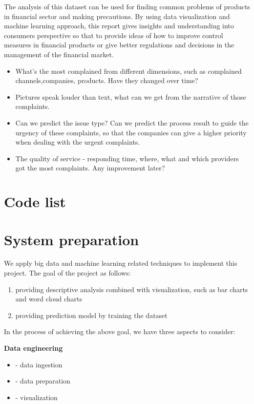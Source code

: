 \documentclass[conference]{IEEEtran}
\begin{document}
The analysis of this dataset can be used for  finding common problems of products in financial sector and making precautions. By using data visualization and machine learning approach, this report gives insights and understanding into consumers perspective so that to provide ideas of how to improve control measures in financial products or give better regulations and decisions in the management of the financial market.
\begin{itemize}
\item What's the most complained from different dimensions, such as complained channels,companies, products. Have they changed over time?

\item Pictures speak louder than text, what can we get from the narrative of those complaints.

\item Can we predict the issue type? Can we predict the process result to guide the urgency of these complaints, so that the companies can give a  higher priority when dealing with the urgent complaints.
\item The quality of service - responding time, where, what and which providers got the most complaints. Any improvement later? 

\end{itemize}

\section{Code list}

\section{System preparation}\label{AA}
We apply big data and machine learning related techniques to implement this project. The goal of the project as follows:
\begin{enumerate}[label=(\roman*)]
\item providing descriptive analysis combined with visualization, such as bar charts and word cloud charts
\item providing prediction model by training the dataset
\end{enumerate}

In the process of achieving the above goal, we have three aspects to consider:

\textbf{Data engineering
}\begin{itemize}
\item  - data ingestion
\item - data preparation 
\item - visualization
\end{itemize}
\end{document}
